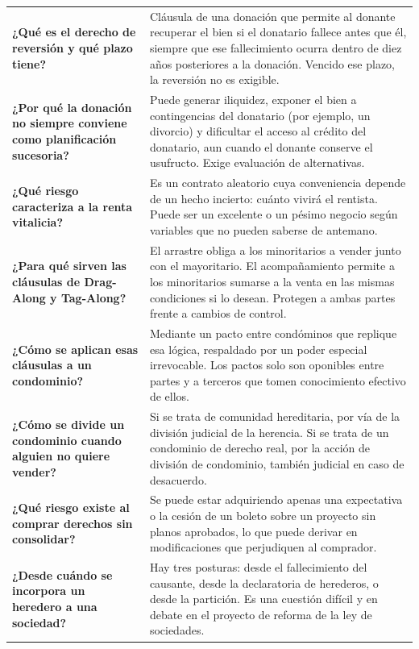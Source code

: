 \documentclass[12pt,oneside]{book}
\begin{document}
\begin{table}[H]
\begin{tabularx}{\textwidth}{
    >{\raggedright\arraybackslash}p{}
    >{\raggedright\arraybackslash}X
}
\textbf{¿Qué es el derecho de reversión y qué plazo tiene?} &
Cláusula de una donación que permite al donante recuperar el bien si el donatario fallece antes que él, siempre que ese fallecimiento ocurra dentro de diez años posteriores a la donación. Vencido ese plazo, la reversión no es exigible. \\

\textbf{¿Por qué la donación no siempre conviene como planificación sucesoria?} &
Puede generar iliquidez, exponer el bien a contingencias del donatario (por ejemplo, un divorcio) y dificultar el acceso al crédito del donatario, aun cuando el donante conserve el usufructo. Exige evaluación de alternativas. \\

\textbf{¿Qué riesgo caracteriza a la renta vitalicia?} &
Es un contrato aleatorio cuya conveniencia depende de un hecho incierto: cuánto vivirá el rentista. Puede ser un excelente o un pésimo negocio según variables que no pueden saberse de antemano. \\

\textbf{¿Para qué sirven las cláusulas de Drag-Along y Tag-Along?} &
El arrastre obliga a los minoritarios a vender junto con el mayoritario. El acompañamiento permite a los minoritarios sumarse a la venta en las mismas condiciones si lo desean. Protegen a ambas partes frente a cambios de control. \\

\textbf{¿Cómo se aplican esas cláusulas a un condominio?} &
Mediante un pacto entre condóminos que replique esa lógica, respaldado por un poder especial irrevocable. Los pactos solo son oponibles entre partes y a terceros que tomen conocimiento efectivo de ellos. \\

\textbf{¿Cómo se divide un condominio cuando alguien no quiere vender?} &
Si se trata de comunidad hereditaria, por vía de la división judicial de la herencia. Si se trata de un condominio de derecho real, por la acción de división de condominio, también judicial en caso de desacuerdo. \\

\textbf{¿Qué riesgo existe al comprar derechos sin consolidar?} &
Se puede estar adquiriendo apenas una expectativa o la cesión de un boleto sobre un proyecto sin planos aprobados, lo que puede derivar en modificaciones que perjudiquen al comprador. \\

\textbf{¿Desde cuándo se incorpora un heredero a una sociedad?} &
Hay tres posturas: desde el fallecimiento del causante, desde la declaratoria de herederos, o desde la partición. Es una cuestión difícil y en debate en el proyecto de reforma de la ley de sociedades. \\


\end{tabularx}
\end{table}
\end{document}
